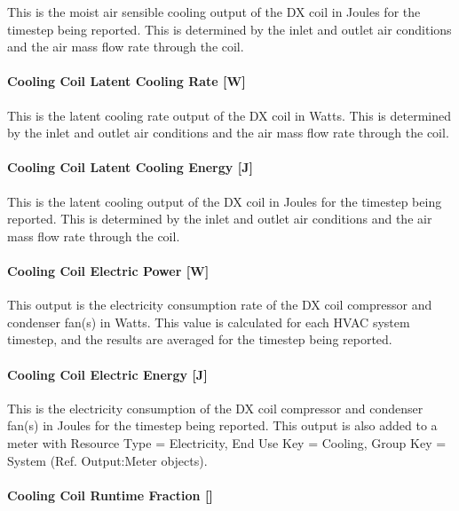 This is the moist air sensible cooling output of the DX coil in Joules for the timestep being reported. This is determined by the inlet and outlet air conditions and the air mass flow rate through the coil.

\paragraph{Cooling Coil Latent Cooling Rate {[}W{]}}\label{cooling-coil-latent-cooling-rate-w-2}

This is the latent cooling rate output of the DX coil in Watts. This is determined by the inlet and outlet air conditions and the air mass flow rate through the coil.

\paragraph{Cooling Coil Latent Cooling Energy {[}J{]}}\label{cooling-coil-latent-cooling-energy-j-2}

This is the latent cooling output of the DX coil in Joules for the timestep being reported. This is determined by the inlet and outlet air conditions and the air mass flow rate through the coil.

\paragraph{Cooling Coil Electric Power {[}W{]}}\label{cooling-coil-electric-power-w}

This output is the electricity consumption rate of the DX coil compressor and condenser fan(s) in Watts. This value is calculated for each HVAC system timestep, and the results are averaged for the timestep being reported.

\paragraph{Cooling Coil Electric Energy {[}J{]}}\label{cooling-coil-electric-energy-j}

This is the electricity consumption of the DX coil compressor and condenser fan(s) in Joules for the timestep being reported. This output is also added to a meter with Resource Type = Electricity, End Use Key = Cooling, Group Key = System (Ref. Output:Meter objects).

\paragraph{Cooling Coil Runtime Fraction {[]}}\label{cooling-coil-runtime-fraction-2}

